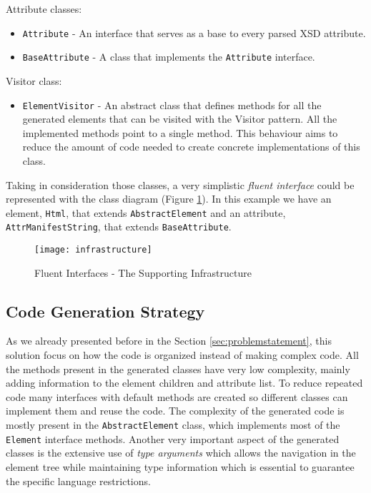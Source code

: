 Attribute classes:

\begin{itemize}  
	\item \texttt{Attribute} - An interface that serves as a base to every parsed \ac{XSD} attribute.
	\item \texttt{BaseAttribute} - A class that implements the \texttt{Attribute} interface. 
\end{itemize}

Visitor class:

\begin{itemize}
	\item \texttt{ElementVisitor} - An abstract class that defines methods for all the generated elements that can be visited with the Visitor pattern. All the implemented methods point to a single method. This behaviour aims to reduce the amount of code needed to create concrete implementations of this class.
\end{itemize}

\noindent
Taking in consideration those classes, a very simplistic \textit{fluent interface} could be represented with the class diagram (Figure \ref{img:infrastructure}). In this example we have an element, \texttt{Html}, that extends \texttt{AbstractElement} and an attribute, \texttt{AttrManifestString}, that extends \texttt{BaseAttribute}. 

\begin{figure}[H]
	\centering
	\texttt{[image: infrastructure]}
	\caption{Fluent Interfaces - The Supporting Infrastructure}
	\label{img:infrastructure}
\end{figure}

\subsection{Code Generation Strategy}
\label{sec:codegenerationstrategy}

As we already presented before in the Section \ref{sec:problemstatement}, this solution focus on how the code is organized instead of making complex code. All the methods present in the generated classes have very low complexity, mainly adding information to the element children and attribute list. To reduce repeated code many interfaces with default methods are created so different classes can implement them and reuse the code. The complexity of the generated code is mostly present in the \texttt{AbstractElement} class, which implements most of the \texttt{Element} interface methods. Another very important aspect of the generated classes is the extensive use of \textit{type arguments} which allows the navigation in the element tree while maintaining type information which is essential to guarantee the specific language restrictions.

